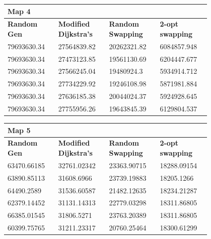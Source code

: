 \documentclass{article}
\begin{document}
\begin{table}[H]
    \centering
    \begin{tabular}{|p{0.2\linewidth}|p{0.2\linewidth}|p{0.2\linewidth}|p{0.2\linewidth}|}
    \hline
        \textbf{Map 4} & ~ & ~ & ~ \\ \hline
        \textbf{Random Gen} & \textbf{Modified Dijkstra's} & \textbf{Random Swapping} & \textbf{2-opt swapping} \\ \hline
        79693630.34 & 27564839.82 & 20262321.82 & 6084857.948 \\ \hline
        79693630.34 & 27473123.85 & 19561130.69 & 6204447.677 \\ \hline
        79693630.34 & 27566245.04 & 19480924.3 & 5934914.712 \\ \hline
        79693630.34 & 27734229.92 & 19246108.98 & 5871981.884 \\ \hline
        79693630.34 & 27636185.38 & 20044024.37 & 5924928.645 \\ \hline
        79693630.34 & 27755956.26 & 19643845.39 & 6129804.537 \\ \hline
    \end{tabular}
\end{table}

\begin{table}[H]
    \centering
    \begin{tabular}{|p{0.2\linewidth}|p{0.2\linewidth}|p{0.2\linewidth}|p{0.2\linewidth}|}
    \hline
        \textbf{Map 5} & ~ & ~ & ~ \\ \hline
        \textbf{Random Gen} & \textbf{Modified Dijkstra's} & \textbf{Random Swapping} & \textbf{2-opt swapping} \\ \hline
        63470.66185 & 32761.02342 & 23363.90715 & 18288.09154 \\ \hline
        63890.85113 & 31608.6966 & 23739.19883 & 18205.1266 \\ \hline
        64490.2589 & 31536.60587 & 21482.12635 & 18234.21287 \\ \hline
        62379.14452 & 31131.14313 & 22779.03298 & 18311.86805 \\ \hline
        66385.01545 & 31806.5271 & 23763.20389 & 18311.86805 \\ \hline
        60399.75765 & 31211.23317 & 20760.25464 & 18300.61299 \\ \hline
     \end{tabular}
\end{table}
\end{document}

